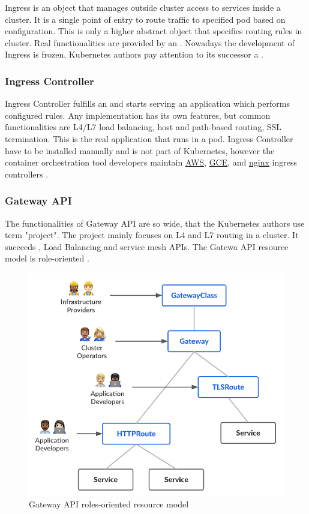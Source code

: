 Ingress is an object that manages outside cluster access to services inside a cluster. It is a single point of entry to route traffic to specified pod based on configuration. This is only a higher abstract object that specifies routing rules in cluster. Real functionalities are provided by an \textit{}. Nowadays the development of Ingress is frozen, Kubernetes authors pay attention to its successor a \textit{} \cite{KubernetesIngress}.

\subsubsection{Ingress Controller}
\label{ingresscontroller}

Ingress Controller fulfills an \textit{} and starts serving an application which performs configured rules. Any implementation has its own features, but common functionalities are L4/L7 load balancing, host and path-based routing, SSL termination. This is the real application that runs in a pod. Ingress Controller have to be installed manually and is not part of Kubernetes, however the container orchestration tool developers maintain \href{https://github.com/kubernetes-sigs/aws-load-balancer-controller#readme}{AWS}, \href{https://github.com/kubernetes/ingress-gce/blob/master/README.md#readme}{GCE}, and \href{https://github.com/kubernetes/ingress-nginx/blob/main/README.md#readme}{nginx} ingress controllers \cite{KubernetesIngress}\cite{KubernetesIngressControllers}. 


\subsubsection{Gateway API}
\label{gatewayapi}

The functionalities of Gateway API are so wide, that the Kubernetes authors use term "project". The project mainly focuses on L4 and L7 routing in a cluster. It succeeds \textit{}, Load Balancing and service mesh APIs. The Gatewa API resource model is role-oriented \cite{KubernetesGatewayAPI}.

\begin{figure}[tbh]
    \centering
    \includegraphics[width=0.7\columnwidth]{images/gateway-api-resource-model.png}
    \caption{Gateway API roles-oriented resource model \cite{KubernetesGatewayAPI}}
    \label{fig:gatewayApiResourceModel}
\end{figure}

